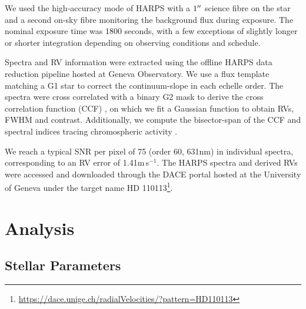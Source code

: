 \documentclass[fleqn,usenatbib]{mnras}
\newcommand{\ms}{m\,s$^{-1}$}
\begin{document}
We used the high-accuracy mode of HARPS with a $1\hbox{$^{\prime\prime}$}$ science fibre on the star and a second on-sky fibre monitoring the background flux during exposure. %
The nominal exposure time was 1800 seconds, with a few exceptions of slightly longer or shorter integration depending on observing conditions and schedule.

Spectra and RV information were extracted using the 
offline HARPS data reduction pipeline hosted at Geneva Observatory. 
We use a flux template matching a G1 star to correct the continuum-slope in each echelle order. 
The spectra were cross correlated with a binary G2 mask to derive the cross correlation function (CCF) \citep{1996A&AS..119..373B}, on which we fit a Gaussian function to obtain RVs, FWHM and contrast. 
Additionally, we compute the bisector-span \citep{2001A&A...379..279Q} of the CCF and spectral indices tracing chromospheric activity \citep{2011A&A...534A..30G,2009A&A...495..959B}.

We reach a typical SNR per pixel of 75 (order 60, 631nm) in individual spectra, corresponding to an RV error of 1.41\ms{}.
The HARPS spectra and derived RVs were accessed and downloaded through the DACE portal hosted at the University of Geneva \citep{2015ASPC..495....7B} under the target name HD 110113\footnote{\url{https://dace.unige.ch/radialVelocities/?pattern=HD110113}}.

\section{Analysis}\label{sect:analysis}
\subsection{Stellar Parameters}
\end{document}
